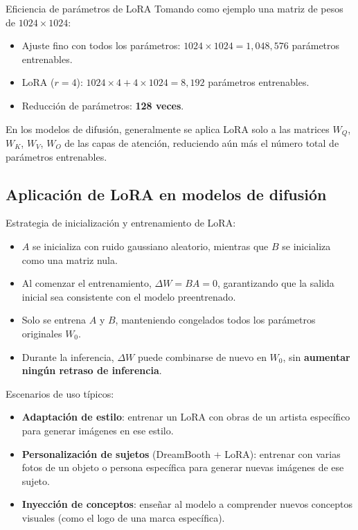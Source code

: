 \begin{importantbox}{Eficiencia de parámetros de LoRA}
Tomando como ejemplo una matriz de pesos de $1024 \times 1024$:
\begin{itemize}
    \item Ajuste fino con todos los parámetros: $1024 \times 1024 = 1,048,576$ parámetros entrenables.
    \item LoRA ($r=4$): $1024 \times 4 + 4 \times 1024 = 8,192$ parámetros entrenables.
    \item Reducción de parámetros: \textbf{128 veces}.
\end{itemize}
En los modelos de difusión, generalmente se aplica LoRA solo a las matrices $W_Q$, $W_K$, $W_V$, $W_O$ de las capas de atención, reduciendo aún más el número total de parámetros entrenables.
\end{importantbox}

\subsection{Aplicación de LoRA en modelos de difusión}

Estrategia de inicialización y entrenamiento de LoRA:

\begin{itemize}
    \item $A$ se inicializa con ruido gaussiano aleatorio, mientras que $B$ se inicializa como una matriz nula.
    \item Al comenzar el entrenamiento, $\Delta W = BA = 0$, garantizando que la salida inicial sea consistente con el modelo preentrenado.
    \item Solo se entrena $A$ y $B$, manteniendo congelados todos los parámetros originales $W_0$.
    \item Durante la inferencia, $\Delta W$ puede combinarse de nuevo en $W_0$, sin \textbf{aumentar ningún retraso de inferencia}.
\end{itemize}

Escenarios de uso típicos:
\begin{itemize}
    \item \textbf{Adaptación de estilo}: entrenar un LoRA con obras de un artista específico para generar imágenes en ese estilo.
    \item \textbf{Personalización de sujetos} (DreamBooth + LoRA): entrenar con varias fotos de un objeto o persona específica para generar nuevas imágenes de ese sujeto.
    \item \textbf{Inyección de conceptos}: enseñar al modelo a comprender nuevos conceptos visuales (como el logo de una marca específica).
\end{itemize}

